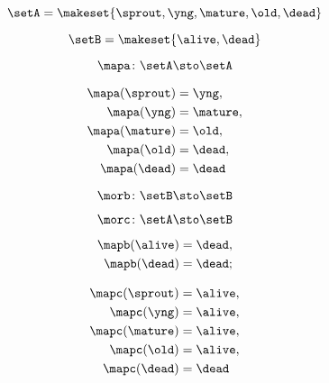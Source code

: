 {\begin{forslides}
        \begin{equation}
            \label{eq:semicats-slides-78}
            \setA = \makeset{ \sprout, \yng, \mature, \old, \dead }
        \end{equation}

        \begin{equation}
            \label{eq:semicats-slides-79}
            \setB = \makeset{ \alive, \dead }
        \end{equation}

        \begin{equation}
            \label{eq:semicats-slides-80}
            \mapa \colon \setA \sto \setA
        \end{equation}

        \begin{equation}
            \label{eq:semicats-slides-81}
            \begin{aligned}
                \mapa(\sprout) & =  \yng, \\
                \mapa(\yng)    & =  \mature, \\
                \mapa(\mature) & =  \old, \\
                \mapa( \old)   & = \dead, \\
                \mapa(\dead)   & = \dead
            \end{aligned}
        \end{equation}

        \begin{equation}
            \label{eq:semicats-slides-82a}
            \morb \colon \setB \sto \setB
        \end{equation}

        \begin{equation}
            \label{eq:semicats-slides-82b}
            \morc \colon \setA \sto \setB
        \end{equation}

        \begin{equation}
            \label{eq:semicats-slides-83}
            \begin{aligned}
                \mapb(\alive) & =  \dead, \\
                \mapb(\dead)  & =  \dead;
            \end{aligned}
        \end{equation}

        \begin{equation}
            \label{eq:semicats-slides-84}
            \begin{aligned}
                \mapc(\sprout) & = \alive, \\
                \mapc(\yng)    & =  \alive, \\
                \mapc(\mature) & = \alive , \\
                \mapc( \old)   & = \alive, \\
                \mapc (\dead)  & = \dead
            \end{aligned}
        \end{equation}


\end{forslides}}
